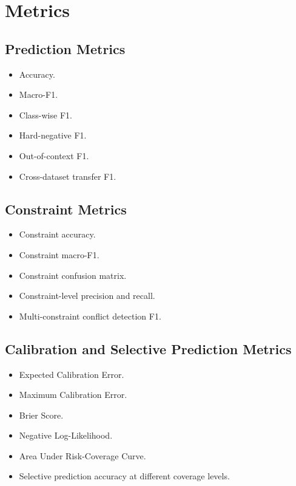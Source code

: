 \documentclass[11pt,a4paper]{article}
\begin{document}
\section{Metrics}

\subsection{Prediction Metrics}

\begin{itemize}[leftmargin=1.5em]
\item Accuracy.
\item Macro-F1.
\item Class-wise F1.
\item Hard-negative F1.
\item Out-of-context F1.
\item Cross-dataset transfer F1.
\end{itemize}

\subsection{Constraint Metrics}

\begin{itemize}[leftmargin=1.5em]
\item Constraint accuracy.
\item Constraint macro-F1.
\item Constraint confusion matrix.
\item Constraint-level precision and recall.
\item Multi-constraint conflict detection F1.
\end{itemize}

\subsection{Calibration and Selective Prediction Metrics}

\begin{itemize}[leftmargin=1.5em]
\item Expected Calibration Error.
\item Maximum Calibration Error.
\item Brier Score.
\item Negative Log-Likelihood.
\item Area Under Risk-Coverage Curve.
\item Selective prediction accuracy at different coverage levels.
\end{itemize}
\end{document}

